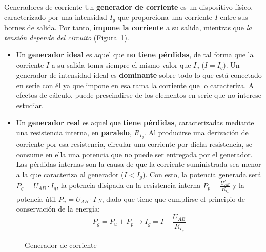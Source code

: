 \documentclass[11pt]{book} %
\makeatletter
\numberwithin{dummy}{section}
\theoremstyle{ocrenumbox}
\theoremstyle{blacknumex}
\theoremstyle{blacknumbox}
\theoremstyle{ocrenum}
\renewcommand{\subsubsection}{\@startsection {subsubsection}{3}{\z@}
{-2ex \@plus -0.1ex \@minus -.2ex}
{.2ex \@plus.2ex }
{\normalfont\small\sffamily\bfseries}}
\makeatother
\begin{document}
	\subsubsection{Generadores de corriente}
	Un \textbf{generador de corriente} es un dispositivo físico, caracterizado por una intensidad $I_g$ que proporciona una corriente $I$ entre sus bornes de salida. Por tanto, \textbf{impone la corriente} a su salida, mientras que \emph{la tensión depende del circuito} (Figura~\ref{fig.fuentecorriente}).
	\begin{itemize}
		\item Un \textbf{generador ideal} es aquel que \textbf{no tiene pérdidas}, de tal forma que la corriente $I$ a su salida toma siempre el mismo valor que $I_g$ ($I=I_g$). Un generador de intensidad ideal es \textbf{dominante} sobre todo lo que está conectado en serie con él ya que impone en esa rama la corriente que lo caracteriza. A efectos de cálculo, puede prescindirse de los elementos en serie que no interese estudiar. 
		\item Un \textbf{generador real} es aquel que \textbf{tiene pérdidas}, caracterizadas mediante una resistencia interna, en \textbf{paralelo}, $R_{I_g}$. Al producirse una derivación de corriente por esa resistencia, circular una corriente por dicha resistencia, se consume en ella una potencia que no puede ser entregada por el generador. Las pérdidas internas son la causa de que la corriente suministrada sea menor a la que caracteriza al generador ($I<I_g$). Con esto, la potencia generada será $P_g=U_{AB}\cdot I_g$, la potencia disipada en la resistencia interna $P_p=\frac{U_{AB}^2}{R_{I_g}}$ y la potencia útil $P_u=U_{AB}\cdot I$ y, dado que tiene que cumplirse el principio de conservación de la energía:
		\begin{equation}
			P_g=P_u+P_p\rightarrow \boxed{I_g=I+ \dfrac{U_{AB}}{R_{I_g}}}
		\end{equation}
	\end{itemize}
	\begin{figure}[htbp]
		\centering
		\hfil
		\caption{Generador de corriente}
		\label{fig.fuentecorriente}
	\end{figure}
	
\end{document}
